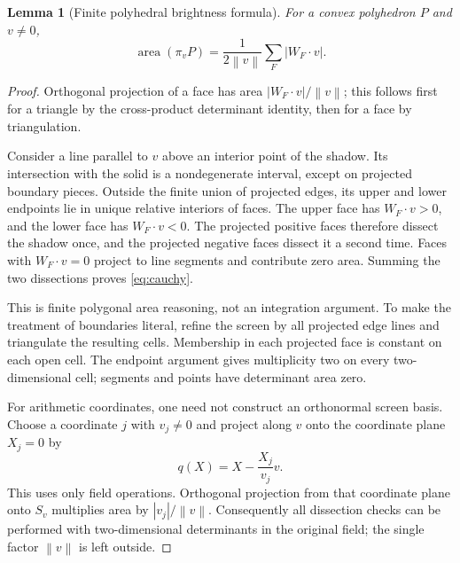 \documentclass[11pt,a4paper]{article}
\newtheorem{lemma}[theorem]{Lemma}
\newcommand{\norm}[1]{\left\lVert#1\right\rVert}
\newcommand{\abs}[1]{\left|#1\right|}
\newcommand{\area}{\operatorname{area}}
\begin{document}
\begin{lemma}[Finite polyhedral brightness formula]\label{lem:brightness}
For a convex polyhedron $P$ and $v\ne0$,
\begin{equation}
 \area(\pi_vP)=\frac1{2\norm v}\sum_F\abs{W_F\cdot v}.
 \label{eq:cauchy}
\end{equation}
\end{lemma}
\begin{proof}
Orthogonal projection of a face has area $\abs{W_F\cdot v}/\norm v$; this follows first for a triangle by the cross-product determinant identity, then for a face by triangulation.

Consider a line parallel to $v$ above an interior point of the shadow. Its intersection with the solid is a nondegenerate interval, except on projected boundary pieces. Outside the finite union of projected edges, its upper and lower endpoints lie in unique relative interiors of faces. The upper face has $W_F\cdot v>0$, and the lower face has $W_F\cdot v<0$. The projected positive faces therefore dissect the shadow once, and the projected negative faces dissect it a second time. Faces with $W_F\cdot v=0$ project to line segments and contribute zero area. Summing the two dissections proves \eqref{eq:cauchy}.

This is finite polygonal area reasoning, not an integration argument. To make the treatment of boundaries literal, refine the screen by all projected edge lines and triangulate the resulting cells. Membership in each projected face is constant on each open cell. The endpoint argument gives multiplicity two on every two-dimensional cell; segments and points have determinant area zero.

For arithmetic coordinates, one need not construct an orthonormal screen basis. Choose a coordinate $j$ with $v_j\ne0$ and project along $v$ onto the coordinate plane $X_j=0$ by
\[
 q(X)=X-\frac{X_j}{v_j}v.
\]
This uses only field operations. Orthogonal projection from that coordinate plane onto $S_v$ multiplies area by $\abs{v_j}/\norm v$. Consequently all dissection checks can be performed with two-dimensional determinants in the original field; the single factor $\norm v$ is left outside.
\end{proof}
\end{document}

